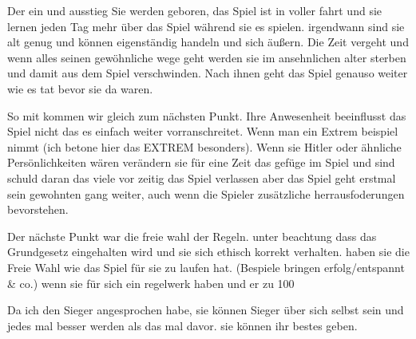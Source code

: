     Der ein und ausstieg 
        Sie werden geboren, das Spiel ist in voller fahrt und sie lernen jeden Tag mehr über das Spiel während sie es spielen. irgendwann sind sie alt genug und können eigenständig handeln und sich äußern.
        Die Zeit vergeht und wenn alles seinen gewöhnliche wege geht werden sie im ansehnlichen alter sterben und damit aus dem Spiel verschwinden. Nach ihnen geht das Spiel genauso weiter wie es tat bevor sie da waren.

    So mit kommen wir gleich zum nächsten Punkt. Ihre Anwesenheit beeinflusst das Spiel nicht das es einfach weiter vorranschreitet. Wenn man ein Extrem beispiel nimmt (ich betone hier das EXTREM besonders). Wenn sie Hitler oder ähnliche Persönlichkeiten wären verändern sie für eine Zeit das gefüge im Spiel und sind schuld daran das viele vor zeitig das Spiel verlassen aber das Spiel geht erstmal sein gewohnten gang weiter, auch wenn die Spieler zusätzliche herrausfoderungen bevorstehen. 

    Der nächste Punkt war die freie wahl der Regeln.  unter beachtung dass das Grundgesetz eingehalten wird und sie sich ethisch korrekt verhalten. haben sie die Freie Wahl wie das Spiel für sie zu laufen hat. (Bespiele bringen erfolg/entspannt & co.)
        wenn sie für sich ein regelwerk haben und er zu 100%

    Da ich den Sieger angesprochen habe, sie können Sieger über sich selbst sein und jedes mal besser werden als das mal davor. sie können ihr bestes geben. 

 
